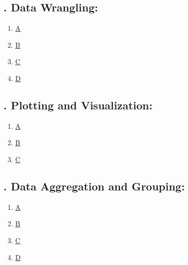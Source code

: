 \documentclass[11pt]{article}
\begin{document}
\subsection*{\small {}. Data Wrangling:}

\vspace{-0.5cm}

\begin{multicols}{6}
	\begin{enumerate}
		\item \href{https://mp.weixin.qq.com/s/fVFTsyc7x0HmHpIjTDWKKQ}{A}	%
		\item \href{https://mp.weixin.qq.com/s/hwahCwbD1oV5lZBnUzLkhQ}{B}	%
		\item \href{https://mp.weixin.qq.com/s/i1ijOErY-16FPzZlR2lIUA}{C}	%
		\item \href{https://mp.weixin.qq.com/s/MRoJyF7ONVWafIQ9BkmRmQ}{D}	%
	\end{enumerate}
\end{multicols}

\newpage 

\subsection*{\small {}. Plotting and Visualization:}

\vspace{-0.5cm}

\begin{multicols}{6}
	\begin{enumerate}
		\item \href{https://mp.weixin.qq.com/s/c9_rlYHezbdSiM2DOt4spA}{A}	%
		\item \href{https://mp.weixin.qq.com/s/hbIy0KaAvaUPNQgoKc7qHQ}{B}	%
		\item \href{https://mp.weixin.qq.com/s/-h9YmJSnSOQhIrly9EqlMA}{C}	%
	\end{enumerate}
\end{multicols} 

\subsection*{\small {}. Data Aggregation and Grouping:}

\vspace{-0.5cm}

\begin{multicols}{6}
	\begin{enumerate}
		\item \href{https://mp.weixin.qq.com/s/444q8Mzr3xLbxh54_ErYdA}{A}	%
		\item \href{https://mp.weixin.qq.com/s/Vi3RoaljgjW_L6rztiXxYw}{B}	%
		\item \href{https://mp.weixin.qq.com/s/ivQNQYV3VqqZDIsot4KnVw}{C}	%
		\item \href{https://mp.weixin.qq.com/s/BQyyFE8yEW66FVW4btQb0g}{D}	%
	\end{enumerate}
\end{multicols}
\end{document}
